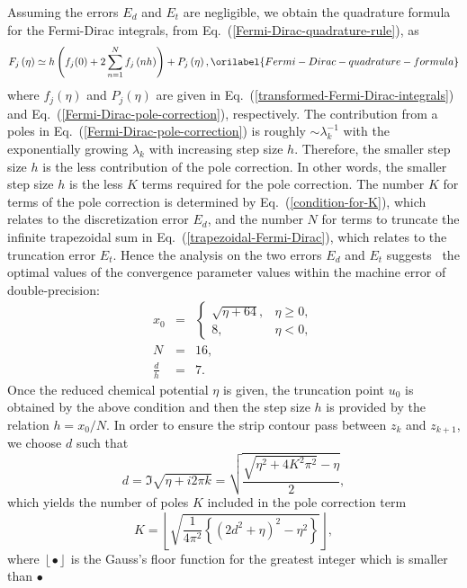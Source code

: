 \documentclass[aps,showkeys,noshowpacs,superscriptaddress,pre,preprint]{revtex4-2}
\let\label\orilabel
\begin{document}
Assuming the errors $E_d$ and $E_t$ are negligible,
we obtain the quadrature formula for the Fermi-Dirac integrals, 
from Eq.~(\ref{Fermi-Dirac-quadrature-rule}), as
\begin{equation}
F_j \left( \eta \right) \simeq h \left( {f_j (0)} + 2 \sum_{n = 1}^{N} {f_j \left( nh \right)} \right) + P_j \left( \eta \right) ,
\label{Fermi-Dirac-quadrature-formula}
\end{equation}
where $f_j ( \eta )$ and $P_j \left( \eta \right)$ are given in Eq.~(\ref{transformed-Fermi-Dirac-integrals}) and
Eq.~(\ref{Fermi-Dirac-pole-correction}), respectively.
The contribution from a poles in Eq.~(\ref{Fermi-Dirac-pole-correction}) is roughly $\sim \lambda_k^{-1}$
with the exponentially growing $\lambda_k$ with increasing step size $h$.
Therefore, the smaller step size $h$ is the less contribution of the pole correction.
In other words, the smaller step size $h$ is the less $K$ terms required for the pole correction.
The number $K$ for terms of the pole correction is determined by Eq.~(\ref{condition-for-K}),
which relates to the discretization error $E_d$,
and the number $N$ for terms to truncate the infinite trapezoidal sum in Eq.~(\ref{trapezoidal-Fermi-Dirac}),
which relates to the truncation error $E_t$.
Hence the analysis on the two errors $E_d$ and $E_t$ suggests~\cite{Mohankumar-Natarajan1995} 
the optimal values of the convergence parameter values within the machine error of double-precision:
\begin{eqnarray*}
x_0 &=& \begin{cases}
\sqrt{\eta + 64}, & \eta \ge 0, \\
8, & \eta < 0,
\end{cases}
\\
N &=& 16, \\
\frac{d}{h} &=& 7 .
\end{eqnarray*}
Once the reduced chemical potential $\eta$ is given, 
the truncation point $u_0$ is obtained by the above condition 
and then the step size $h$ is provided by the relation $h = x_0 / N$.
In order to ensure the strip contour pass between $z_k$ and $z_{k+1}$,
we choose $d$ such that
\begin{equation*}
d = \Im \sqrt{\eta + i 2 \pi k} = \sqrt{\frac{\sqrt{\eta^2 + 4K^2 \pi^2} - \eta}{2}} ,
\end{equation*}
which yields the number of poles $K$ included in the pole correction term
\begin{equation}
K = \left\lfloor \sqrt{ \frac{1}{4 \pi^2} \left\{ \left( 2 d^2 + \eta \right)^2 - \eta^2 \right\} } \right\rfloor ,
\end{equation}
where $\left\lfloor \bullet \right\rfloor$ is the Gauss's floor function 
for the greatest integer which is smaller than $\bullet$
\end{document}
